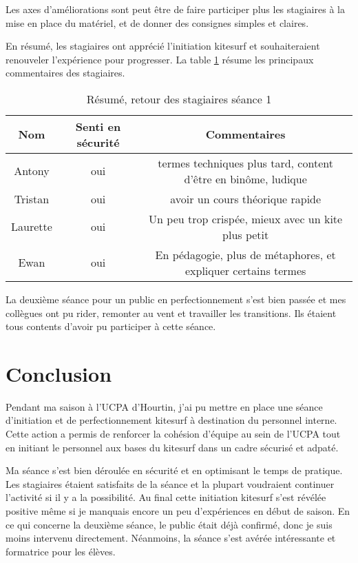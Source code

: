 \documentclass[11pt,a4paper]{report}
\begin{document}
Les axes d'améliorations sont peut \^etre de faire participer
plus les stagiaires à la mise en place du matériel, et de
donner des consignes simples et claires. 

En résumé, les stagiaires ont apprécié l'initiation kitesurf et
souhaiteraient renouveler l'expérience pour progresser. La table
\ref{stagiaire_feedback} résume les principaux commentaires des stagiaires.

\begin{table}[h]
\begin{tabular}{|c|c|c|}
        \hline
        \textbf{Nom} & \textbf{Senti en sécurité} & \textbf{Commentaires} \\ 
        \hline
       Antony      &  oui    &   termes techniques plus tard, content d’être en binôme, ludique         \\
       \hline
       Tristan     &  oui    & avoir un cours théorique rapide  \\
       \hline
        Laurette   &  oui    & Un peu trop crispée, mieux avec un kite plus petit \\
        \hline
        Ewan       &  oui    & En pédagogie, plus de métaphores, et expliquer certains termes\\
        \hline
\end{tabular}
\caption{Résumé, retour des stagiaires séance 1\label{stagiaire_feedback}}
\end{table}

La deuxième séance pour un public en perfectionnement s'est bien passée et 
mes collègues ont pu rider, remonter au vent et travailler les transitions. Ils étaient tous contents
d'avoir pu participer à cette séance.



\FloatBarrier
\section{Conclusion}

Pendant ma saison à l'UCPA d'Hourtin, j'ai pu mettre en place une 
séance d'initiation et de perfectionnement kitesurf à destination 
du personnel interne.
Cette action a permis de renforcer la cohésion d'équipe au sein de l'UCPA
tout en initiant le personnel aux bases du kitesurf dans un cadre 
sécurisé et adpaté.

Ma séance s'est bien déroulée en sécurité et en optimisant 
le temps de pratique. Les stagiaires étaient  satisfaits de la 
séance et la plupart voudraient continuer l'activité si il 
y a la possibilité.
Au final cette initiation kitesurf s'est révélée  positive m\^eme si
je manquais encore un peu d'expériences en début de saison.
En ce qui concerne la deuxième séance, le public était déjà confirmé, 
donc je suis moins intervenu directement. Néanmoins, la séance s'est avérée
intéressante et formatrice pour les élèves.
\end{document}
